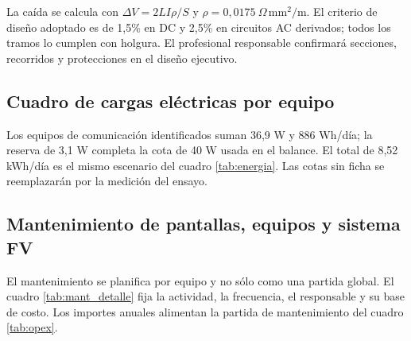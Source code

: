 La caída se calcula con $\Delta V = 2LI\rho/S$ y $\rho = 0,0175\ \Omega\,\mathrm{mm^2/m}$. El criterio de diseño adoptado es de 1,5\% en DC y 2,5\% en circuitos AC derivados; todos los tramos lo cumplen con holgura. El profesional responsable confirmará secciones, recorridos y protecciones en el diseño ejecutivo.

\subsection{Cuadro de cargas eléctricas por equipo}
Los equipos de comunicación identificados suman 36,9 W y 886 Wh/día; la reserva de 3,1 W completa la cota de 40 W usada en el balance. El total de 8,52 kWh/día es el mismo escenario del cuadro \ref{tab:energia}. Las cotas sin ficha se reemplazarán por la medición del ensayo.

\subsection{Mantenimiento de pantallas, equipos y sistema FV}
El mantenimiento se planifica por equipo y no sólo como una partida global. El cuadro \ref{tab:mant_detalle} fija la actividad, la frecuencia, el responsable y su base de costo. Los importes anuales alimentan la partida de mantenimiento del cuadro \ref{tab:opex}.


